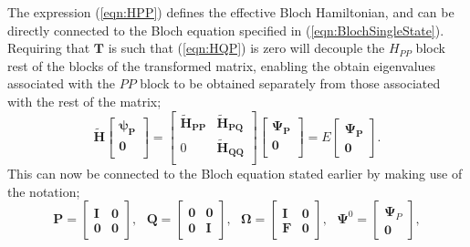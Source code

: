 \noindent The expression (\ref{eqn:HPP}) defines the effective Bloch Hamiltonian, and can be directly connected to the Bloch equation
specified in (\ref{eqn:BlochSingleState}). Requiring that $\mathbf{T}$ is such that (\ref{eqn:HQP}) is zero will decouple the
$H_{PP}$ block rest of the blocks of the transformed matrix, enabling the obtain eigenvalues associated with the $PP$ block to be obtained
separately from those associated with the rest of the matrix;
\begin{equation}
\mathbf{\tilde{H}}
\begin{bmatrix}
 \boldsymbol{\psi_{P}} \\ 
 \mathbf{0} \\ 
\end{bmatrix}
=
\begin{bmatrix}
 \mathbf{\tilde{H}_{PP}} & \mathbf{\tilde{H}_{PQ}} \\ 
 0                       & \mathbf{\tilde{H}_{QQ}} \\ 
\end{bmatrix} 
\begin{bmatrix}
 \boldsymbol{\Psi_{P}} \\ 
 \mathbf{0} \\ 
\end{bmatrix} 
= E 
\begin{bmatrix}
\boldsymbol{\Psi_{P}} \\ 
\mathbf{0} 
\end{bmatrix}.
\label{eqn:TransEvalEqnSimple}
\end{equation}
This can now be connected to the Bloch equation stated earlier by making use of the notation;
\begin{equation}
\mathbf{P} =  
\begin{bmatrix}
\mathbf{I} & \mathbf{0} \\ 
\mathbf{0} & \mathbf{0} 
\end{bmatrix},
\text{ \ \ \ }
\mathbf{Q} =  
\begin{bmatrix}
\mathbf{0} & \mathbf{0} \\ 
\mathbf{0} & \mathbf{I} 
\end{bmatrix},
\text{ \ \ \ }
\boldsymbol{\Omega} =  
\begin{bmatrix}
\mathbf{I} & \mathbf{0} \\ 
\mathbf{F} & \mathbf{0} 
\end{bmatrix},
\text{ \ \ \ }
\boldsymbol{\Psi}^{0} =
\begin{bmatrix}
\boldsymbol{\Psi}_{P} \\
\mathbf{0} 
\end{bmatrix},
\end{equation}

